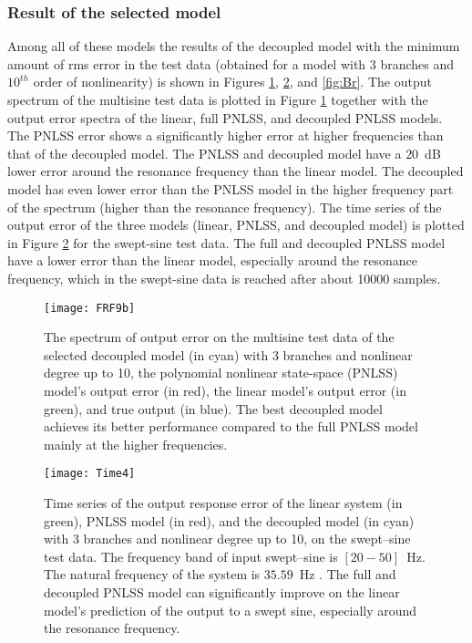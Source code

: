 \documentclass[review]{elsarticle}
\begin{document}
\subsubsection{Result of the selected model}
Among all of these models the results of the decoupled model with the minimum amount of rms error in the test data (obtained for a model with 3 branches and $10^{th}$ order of nonlinearity) is shown in Figures \ref{fig:FRF}, \ref{fig:Time}, and \ref{fig:Br}. The output spectrum of the multisine test data is plotted in Figure \ref{fig:FRF} together with the output error spectra of the linear, full PNLSS, and decoupled PNLSS models. The PNLSS error shows a significantly higher error at higher frequencies than that of the decoupled model. The PNLSS and decoupled model have a $20$~dB lower error around the resonance frequency than the linear model. The decoupled model has even lower error than the PNLSS model in the higher frequency part of the spectrum (higher than the resonance frequency). The time series of the output error of the three models (linear, PNLSS, and decoupled model) is plotted in Figure \ref{fig:Time} for the swept-sine test data. The full and decoupled PNLSS model have a lower error than the linear model, especially around the resonance frequency, which in the swept-sine data is reached after about 10000 samples.
\begin{figure}[ht]
\begin{center}
\texttt{[image: FRF9b]}    %
\caption{The spectrum of output error on the multisine test data of the selected decoupled model (in cyan) with 3 branches and nonlinear degree up to 10, the polynomial nonlinear state-space (PNLSS) model's output error (in red), the linear model's output error (in green), and true output (in blue).
The best decoupled model achieves its better performance compared to the full PNLSS model mainly at the higher frequencies.}
\label{fig:FRF}
\end{center}
\end{figure}
\begin{figure}[ht]
\begin{center}
\texttt{[image: Time4]}    %
\caption{Time series of the output response error of the linear system (in green), PNLSS model (in red), and the decoupled model (in cyan) with 3 branches and nonlinear degree up to 10, on the swept--sine test data. The frequency band of input swept--sine is $[20 - 50]$~Hz. The natural frequency of the system is $35.59$~Hz \citep{Maarten}.
The full and decoupled PNLSS model can significantly improve on the linear model's prediction of the output to a swept sine, especially around the resonance frequency.}
\label{fig:Time}
\end{center}
\end{figure}
\end{document}
